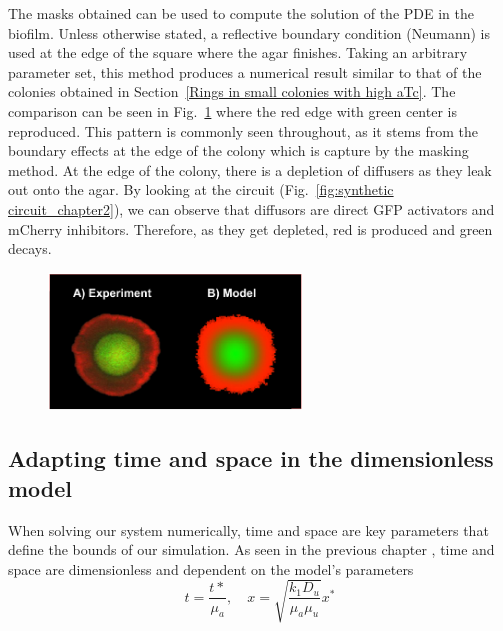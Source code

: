 The masks obtained can be used to compute the solution of the PDE in the biofilm.
Unless otherwise stated, a reflective boundary condition (Neumann) is used at the edge of the square where the agar finishes.
Taking an arbitrary parameter set, this method produces a numerical result similar to that of the colonies obtained in Section~\ref{Rings in small colonies with high aTc}.
The comparison can be seen in Fig.~\ref{small colony experiment vs model} where the red edge with green center is reproduced.
This pattern is commonly seen throughout, as it stems from the boundary effects at the edge of the colony which is capture by the masking method.
At the edge of the colony, there is a depletion of diffusers as they leak out onto the agar.
By looking at the circuit (Fig.~\ref{fig:synthetic circuit_chapter2}), we can observe that diffusors are direct GFP activators and mCherry inhibitors.
Therefore, as they get depleted, red is produced and green decays.
\begin{figure}[H]
    \centering

    \includegraphics[width=0.6\textwidth]{chapters/Chapter 3/small colony experiment vs model}
    \caption{}
    \label{small colony experiment vs model}
\end{figure}

\subsection{Adapting time and space in the dimensionless model}
When solving our system numerically, time and space are key parameters that define the bounds of our simulation.
As seen in the previous chapter , time and space are dimensionless and dependent on the model’s parameters
\begin{equation}\label{time_space_transform}
    t = \frac{t*}{\mu _a}, \quad x = \sqrt{\frac{k_{1}D_{u}}{\mu_{a}\mu_{u}}}x^*
\end{equation}

